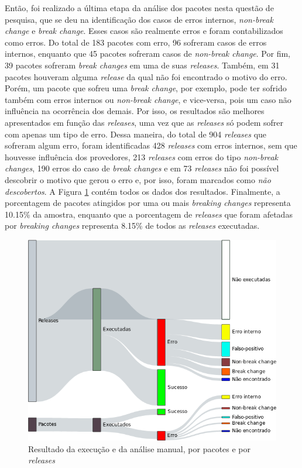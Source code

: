 Então, foi realizado a última etapa da análise dos pacotes nesta questão de pesquisa, que se deu na identificação dos casos de erros internos, \textit{non-break change} e \textit{break change}. Esses casos são realmente erros e foram contabilizados como erros. Do total de 183 pacotes com erro, 96 sofreram casos de erros internos, enquanto que 45 pacotes sofreram casos de \textit{non-break change}. Por fim, 39 pacotes sofreram \textit{break changes} em uma de suas \textit{releases}. Também, em 31 pacotes houveram alguma \textit{release} da qual não foi encontrado o motivo do erro. Porém, um pacote que sofreu uma \textit{break change}, por exemplo, pode ter sofrido também com erros internos ou \textit{non-break change}, e vice-versa, pois um caso não influência na ocorrência dos demais. Por isso, os resultados são melhores apresentados em função das \textit{releases}, uma vez que as \textit{releases} só podem sofrer com apenas um tipo de erro. Dessa maneira, do total de 904 \textit{releases} que sofreram algum erro, foram identificadas 428 \textit{releases} com erros internos, sem que houvesse influência dos provedores, 213 \textit{releases} com erros do tipo \textit{non-break changes}, 190 erros do caso de \textit{break changes} e em 73 \textit{releases} não foi possível descobrir o motivo que gerou o erro e, por isso, foram marcados como \textit{não descobertos}. A Figura \ref{fig:res_rq1_g} contém todos os dados dos resultados. Finalmente, a porcentagem de pacotes atingidos por uma ou mais \textit{breaking changes} representa 10.15\% da amostra, enquanto que a porcentagem de \textit{releases} que foram afetadas por \textit{breaking changes} representa 8.15\% de todos as \textit{releases} executadas.

\begin{figure}
    \centering
    \includegraphics[scale=0.4]{figuras/result_rq1_g.png}
    \caption{Resultado da execução e da análise manual, por pacotes e por \textit{releases}}
    \label{fig:res_rq1_g}
\end{figure}{}

